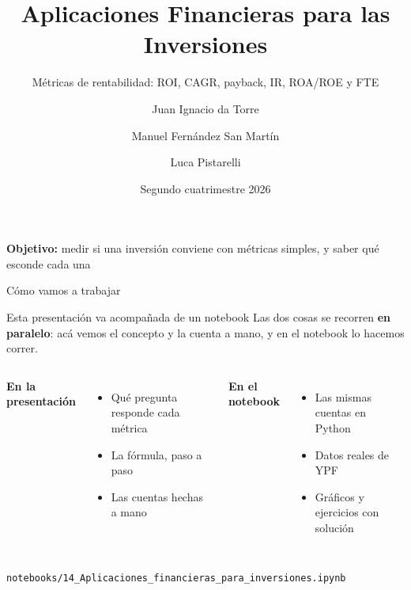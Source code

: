 \documentclass[aspectratio=169,10pt]{beamer}
\title{Aplicaciones Financieras para las Inversiones}
\subtitle{Métricas de rentabilidad: ROI, CAGR, payback, IR, ROA/ROE y FTE}
\author{Juan Ignacio da Torre \and Manuel Fernández San Martín \and Luca Pistarelli}
\institute{
    Laboratorio de Métodos Cuantitativos Aplicados a la Gestión \\
    Universidad de Buenos Aires
}
\date{Segundo cuatrimestre 2026}
\begin{document}
\begin{frame}
\titlepage
\vspace{-0.5cm}
\begin{center}
\textbf{Objetivo:} medir si una inversión conviene con métricas simples,
y saber qué esconde cada una
\end{center}
\end{frame}

\begin{frame}{Cómo vamos a trabajar}

\begin{block}{Esta presentación va acompañada de un notebook}
Las dos cosas se recorren \textbf{en paralelo}: acá vemos el concepto y la cuenta a mano, y en el
notebook lo hacemos correr.
\end{block}

\vspace{0.4cm}

\begin{columns}[T]
\textbf{En la presentación}
\begin{itemize}
  \item Qué pregunta responde cada métrica
  \item La fórmula, paso a paso
  \item Las cuentas hechas a mano
\end{itemize}

\textbf{En el notebook}
\begin{itemize}
  \item Las mismas cuentas en Python
  \item Datos reales de YPF
  \item Gráficos y ejercicios con solución
\end{itemize}
\end{columns}

\vspace{0.4cm}
\begin{center}
\small\texttt{notebooks/14\_Aplicaciones\_financieras\_para\_inversiones.ipynb}
\end{center}
\end{frame}
\end{document}
